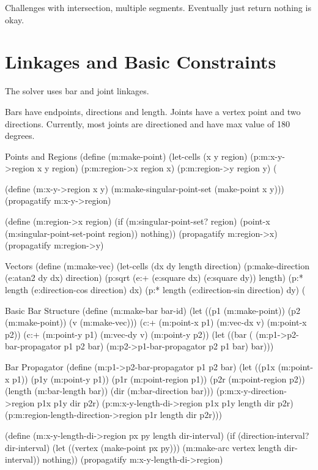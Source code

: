 Challenges with intersection, multiple segments. Eventually just
return nothing is okay.

\section{Linkages and Basic Constraints}

The solver uses bar and joint linkages.

Bars have endpoints, directions and length. Joints have a vertex point
and two directions. Currently, most joints are directioned and have
max value of 180 degrees.

\begin{code-listing}
[label=point-region]
{Points and Regions}
(define (m:make-point)
  (let-cells (x y region)
    (p:m:x-y->region x y region)
    (p:m:region->x region x)
    (p:m:region->y region y)
    (%

(define (m:x-y->region x y)
  (m:make-singular-point-set (make-point x y)))
(propagatify m:x-y->region)

(define (m:region->x region)
  (if (m:singular-point-set? region)
      (point-x (m:singular-point-set-point region))
      nothing))
(propagatify m:region->x)
(propagatify m:region->y)
\end{code-listing}

\begin{code-listing}
[label=bar-struct]
{Vectors}
(define (m:make-vec)
  (let-cells (dx dy length direction)
    (p:make-direction (e:atan2 dy dx) direction)
    (p:sqrt (e:+ (e:square dx)
                 (e:square dy))
            length)
    (p:* length (e:direction-cos direction) dx)
    (p:* length (e:direction-sin direction) dy)
    (%
\end{code-listing}

\begin{code-listing}
[label=bar-struct]
{Basic Bar Structure}
(define (m:make-bar bar-id)
  (let ((p1 (m:make-point))
        (p2 (m:make-point))
        (v (m:make-vec)))
    (c:+ (m:point-x p1) (m:vec-dx v)
         (m:point-x p2))
    (c:+ (m:point-y p1) (m:vec-dy v)
         (m:point-y p2))
    (let ((bar (%
      (m:p1->p2-bar-propagator p1 p2 bar)
      (m:p2->p1-bar-propagator p2 p1 bar)
      bar)))
\end{code-listing}

\begin{code-listing}
[label=bar-propagator]
{Bar Propagator}
(define (m:p1->p2-bar-propagator p1 p2 bar)
  (let ((p1x (m:point-x p1))
        (p1y (m:point-y p1))
        (p1r (m:point-region p1))
        (p2r (m:point-region p2))
        (length (m:bar-length bar))
        (dir (m:bar-direction bar)))
    (p:m:x-y-direction->region p1x p1y dir p2r)
    (p:m:x-y-length-di->region p1x p1y length dir p2r)
    (p:m:region-length-direction->region p1r length dir p2r)))

(define (m:x-y-length-di->region px py length dir-interval)
  (if (direction-interval? dir-interval)
      (let ((vertex (make-point px py)))
        (m:make-arc vertex length dir-interval))
      nothing))
(propagatify m:x-y-length-di->region)
\end{code-listing}

